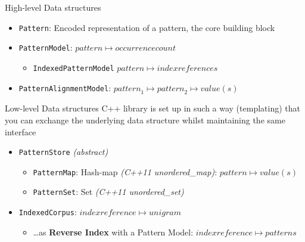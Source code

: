 \documentclass[compress]{beamer}
\begin{document}
\begin{frame}

  \begin{block}{High-level Data structures}
    \begin{itemize}
      \item \texttt{Pattern}: Encoded representation of a pattern, the core
        building block
      \item \texttt{PatternModel}: ${pattern} \mapsto {occurrencecount}$
      \begin{itemize}
        \item \texttt{IndexedPatternModel} ${pattern} \mapsto {indexreferences}$
      \end{itemize}
      \item \texttt{PatternAlignmentModel}:  ${pattern}_1 \mapsto {pattern}_2 \mapsto {value(s)}$
    \end{itemize}
  \end{block}

  \begin{block}{Low-level Data structures}
     C++ library is set up in such a way (templating) that you can exchange the
      underlying data structure whilst maintaining the same interface

    \begin{itemize}
      \item \texttt{PatternStore} \emph{(abstract)}
      \begin{itemize}
        \item \texttt{PatternMap}: Hash-map \emph{(C++11 unordered\_map)}:
          ${pattern} \mapsto {value(s)}$
        \item \texttt{PatternSet}: Set \emph{(C++11 unordered\_set)}
      \end{itemize}
      \item \texttt{IndexedCorpus}: ${indexreference} \mapsto {unigram}$
      \begin{itemize}
        \item \ldots as \textbf{Reverse Index} with a Pattern Model: ${indexreference} \mapsto {patterns}$
      \end{itemize}
    \end{itemize}
\end{block}

\end{frame}
\end{document}
